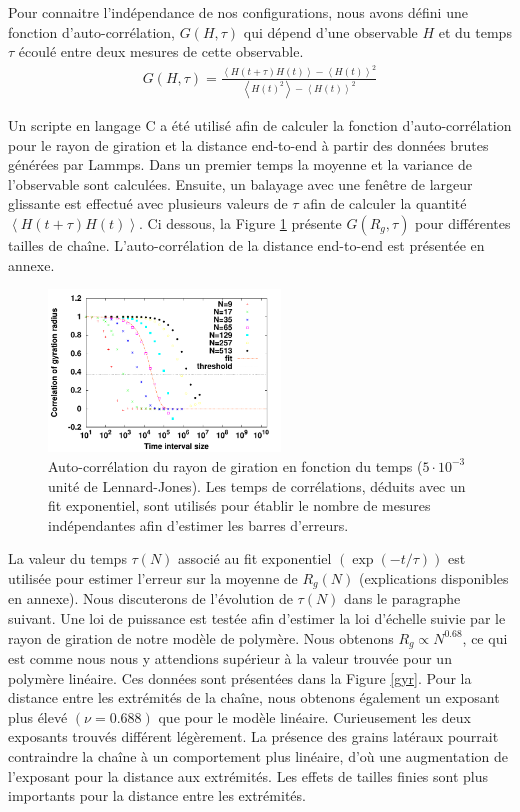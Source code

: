 \documentclass[a4paper,11pt]{article}
\begin{document}
Pour connaitre l'indépendance de nos configurations, nous avons défini une fonction d'auto-corrélation, $G(H,\tau)$ qui dépend d'une observable $H$ et du temps $\tau$ écoulé entre deux mesures de cette observable.
\begin{eqnarray}
G(H,\tau)=\frac{\left<H(t+\tau)H(t)\right> -\left<H(t)\right>^2}{\left<H(t)^2\right> -\left<H(t)\right> ^2}
\end{eqnarray}

Un scripte en langage C a été utilisé afin de calculer la fonction d'auto-corrélation pour le rayon de giration et la distance end-to-end à partir des données brutes générées par Lammps. Dans un premier temps la moyenne et la variance de l'observable sont calculées. Ensuite, un balayage avec une fenêtre de largeur glissante est effectué avec plusieurs valeurs de $\tau$ afin de calculer la quantité $\left<H(t+\tau)H(t)\right>$. Ci dessous, la Figure \ref{correlgyr} présente $G(R_g,\tau)$ pour différentes tailles de chaîne. L'auto-corrélation de la distance end-to-end est présentée en annexe.


\begin{figure}[H]
\begin{center}
\includegraphics[width=0.55\textwidth]{correlgyr.pdf}
\caption{Auto-corrélation du rayon de giration en fonction du temps ($5\cdot10^{-3}$ unité de Lennard-Jones). Les temps de corrélations, déduits avec un fit exponentiel, sont utilisés pour établir le nombre de mesures indépendantes afin d'estimer les barres d'erreurs.}
\label{correlgyr}
\end{center}
\end{figure}

La valeur du temps $\tau(N)$ associé au fit exponentiel $(\exp(-t/\tau))$ est utilisée pour estimer l'erreur sur la moyenne de $R_g(N)$ (explications disponibles en annexe). Nous discuterons de l'évolution de $\tau(N)$ dans le paragraphe suivant. Une loi de puissance est testée afin d'estimer la loi d'échelle suivie par le rayon de giration de notre modèle de polymère. Nous obtenons $R_g \propto N^{0.68}$, ce qui est comme nous nous y attendions supérieur à la valeur trouvée pour un polymère linéaire. Ces données sont présentées dans la Figure \ref{gyr}. Pour la distance entre les extrémités de la chaîne, nous obtenons également un exposant plus élevé $(\nu=0.688)$ que pour le modèle linéaire. Curieusement les deux exposants trouvés différent légèrement. La présence des grains latéraux pourrait contraindre la chaîne à un comportement plus linéaire, d'où une augmentation de l'exposant pour la distance aux extrémités. Les effets de tailles finies sont plus importants pour la distance entre les extrémités.
\end{document}
